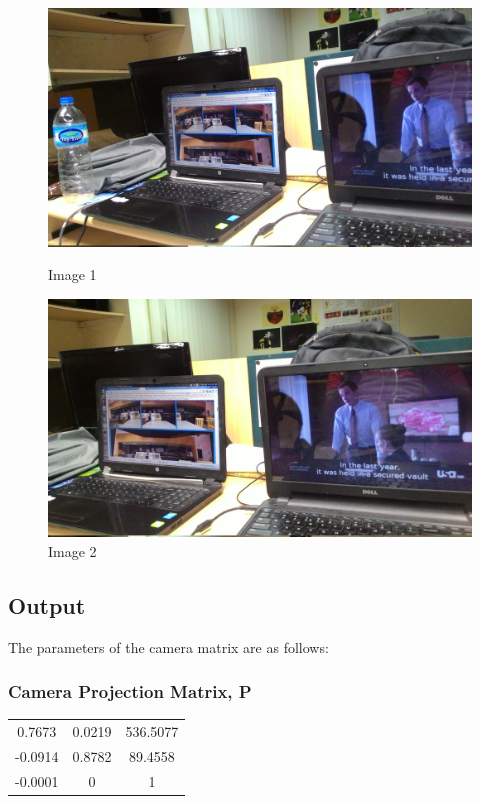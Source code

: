 \documentclass[12pt]{article}
\begin{document}
\begin{figure}[h]
\centering
\begin{minipage}{0.6\textwidth}
\centering
\includegraphics[scale = 0.067]{pt1.jpg}
\caption{Image 1}
\label{fig:Image 1}
\end{minipage}%

\begin{minipage}{.5\textwidth}
\centering
\includegraphics[scale = 0.067]{pt2.jpg}
\caption{Image 2}
\label{fig:Image 2}
\end{minipage}%
\end{figure}
\clearpage

\subsection{Output}

The parameters of the camera matrix are as follows:
\subsubsection{Camera Projection Matrix, P} 
\begin{tabular}{|c|c|c|}
\hline

0.7673 &  0.0219 &  536.5077 \\
 -0.0914 &  0.8782 &  89.4558 \\
 -0.0001 &  0 &  1 \\
\hline
\end{tabular}
                  
\end{document}
